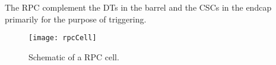    The RPC complement the DTs in the barrel and the CSCs in the endcap 
      primarily for the purpose of triggering.

    \begin{figure}[!Hhbt]
      \centering
      \texttt{[image: rpcCell]}
      \caption{Schematic of a RPC cell.}
      \label{fig:rpcSchem}
    \end{figure}
  
